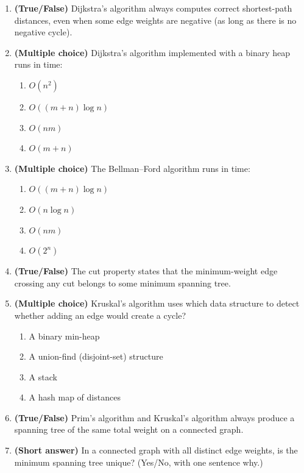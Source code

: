 \documentclass[11pt]{article}
\begin{document}
\begin{enumerate}[label=\textbf{B\arabic*.}, leftmargin=2.2em]

\item \textbf{(True/False)} Dijkstra's algorithm always computes correct
shortest-path distances, even when some edge weights are negative (as long as
there is no negative cycle).

\item \textbf{(Multiple choice)} Dijkstra's algorithm implemented with a binary
heap runs in time:
\begin{enumerate}[label=(\alph*)]
    \item $O(n^2)$
    \item $O((m+n)\log n)$
    \item $O(nm)$
    \item $O(m + n)$
\end{enumerate}

\item \textbf{(Multiple choice)} The Bellman--Ford algorithm runs in time:
\begin{enumerate}[label=(\alph*)]
    \item $O((m+n)\log n)$
    \item $O(n \log n)$
    \item $O(nm)$
    \item $O(2^n)$
\end{enumerate}

\item \textbf{(True/False)} The cut property states that the minimum-weight edge
crossing any cut belongs to some minimum spanning tree.

\item \textbf{(Multiple choice)} Kruskal's algorithm uses which data structure to
detect whether adding an edge would create a cycle?
\begin{enumerate}[label=(\alph*)]
    \item A binary min-heap
    \item A union-find (disjoint-set) structure
    \item A stack
    \item A hash map of distances
\end{enumerate}

\item \textbf{(True/False)} Prim's algorithm and Kruskal's algorithm always
produce a spanning tree of the same total weight on a connected graph.

\item \textbf{(Short answer)} In a connected graph with all distinct edge
weights, is the minimum spanning tree unique? (Yes/No, with one sentence why.)


\end{enumerate}
\end{document}
